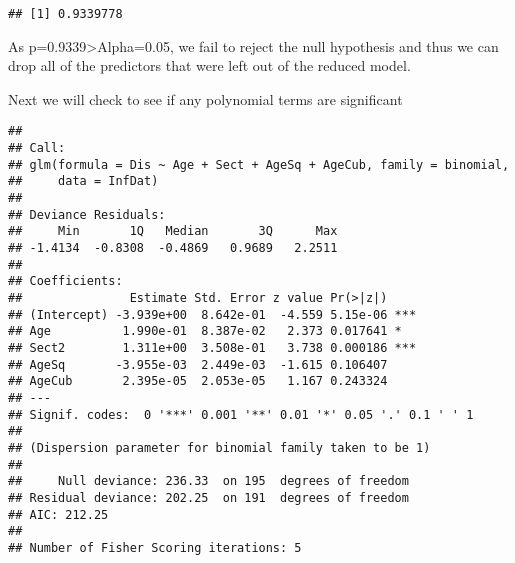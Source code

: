 \documentclass[]{article}
\newenvironment{Shaded}{\begin{snugshade}}{\end{snugshade}}
\newcommand{\KeywordTok}[1]{\textcolor[rgb]{0.13,0.29,0.53}{\textbf{#1}}}
\newcommand{\DataTypeTok}[1]{\textcolor[rgb]{0.13,0.29,0.53}{#1}}
\newcommand{\DecValTok}[1]{\textcolor[rgb]{0.00,0.00,0.81}{#1}}
\newcommand{\OperatorTok}[1]{\textcolor[rgb]{0.81,0.36,0.00}{\textbf{#1}}}
\newcommand{\NormalTok}[1]{#1}
\begin{document}
\begin{verbatim}
## [1] 0.9339778
\end{verbatim}

As p=0.9339\textgreater{}Alpha=0.05, we fail to reject the null
hypothesis and thus we can drop all of the predictors that were left out
of the reduced model.

Next we will check to see if any polynomial terms are significant

\begin{Shaded}
\end{Shaded}

\begin{verbatim}
## 
## Call:
## glm(formula = Dis ~ Age + Sect + AgeSq + AgeCub, family = binomial, 
##     data = InfDat)
## 
## Deviance Residuals: 
##     Min       1Q   Median       3Q      Max  
## -1.4134  -0.8308  -0.4869   0.9689   2.2511  
## 
## Coefficients:
##               Estimate Std. Error z value Pr(>|z|)    
## (Intercept) -3.939e+00  8.642e-01  -4.559 5.15e-06 ***
## Age          1.990e-01  8.387e-02   2.373 0.017641 *  
## Sect2        1.311e+00  3.508e-01   3.738 0.000186 ***
## AgeSq       -3.955e-03  2.449e-03  -1.615 0.106407    
## AgeCub       2.395e-05  2.053e-05   1.167 0.243324    
## ---
## Signif. codes:  0 '***' 0.001 '**' 0.01 '*' 0.05 '.' 0.1 ' ' 1
## 
## (Dispersion parameter for binomial family taken to be 1)
## 
##     Null deviance: 236.33  on 195  degrees of freedom
## Residual deviance: 202.25  on 191  degrees of freedom
## AIC: 212.25
## 
## Number of Fisher Scoring iterations: 5
\end{verbatim}
\end{document}
